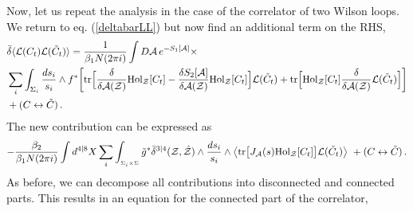 \documentclass[12pt]{article}
\def \tr {\mathop{\rm tr}\nolimits}
\numberwithin{equation}{section}
\begin{document}
Now, let us repeat the analysis in the case of the correlator of two Wilson loops. We return to eq. (\ref{deltabarLL}) but now find an additional term on the RHS,
\begin{align}
&\bar{\delta} \langle \mathcal{L}(C_t) \mathcal{L}(\tilde{C}_t)\rangle = \frac{1}{\beta_1 N (2 \pi i)} \int D \mathcal{A} \, e^{-S_1[\mathcal{A}]} \times \notag \\
 &\sum_i \int_{\Sigma_i} \frac{ds_i}{s_i} \wedge  f^*  \biggl[\tr \Bigl[   \frac{\delta}{\delta \mathcal{A}(\mathcal{Z})}{\rm Hol}_{\mathcal{Z}}[C_t] - \frac{\delta S_2[\mathcal{A}]}{\delta \mathcal{A}(\mathcal{Z})}  {\rm Hol}_{\mathcal{Z}}[C_t] \Bigr] \mathcal{L}(\tilde{C}_t) + \tr \Bigl[{\rm Hol}_{\mathcal{Z}}[C_t] \frac{\delta}{\delta \mathcal{A}(\mathcal{Z})} \mathcal{L}(\tilde{C}_t)\Bigr] \biggr] \notag \\
&+ (C \leftrightarrow \tilde{C})\,.
\end{align}
The new contribution can be expressed as
\begin{align}
\label{newlooptermLL}
-\frac{\beta_2}{\beta_1 N (2 \pi i)} \int d^{4|8}X \sum_i \int_{{}_{\Sigma_i \times \Sigma}} \tilde{g}^* \bar{\delta}^{3|4}(\mathcal{Z},\hat{\mathcal{Z}}) \wedge \frac{ds_i}{s_i} \wedge \big\langle \! \tr \bigl[ J_{\mathcal{A}}(s) {\rm Hol}_{\mathcal{Z}}[C_t] \bigr] \mathcal{L}(\tilde{C}_t)\big\rangle\  + (C \leftrightarrow \tilde{C}) \,.
\end{align}
As before, we can decompose all contributions into disconnected and connected parts. This results in an equation for the connected part of the correlator,
\end{document}
